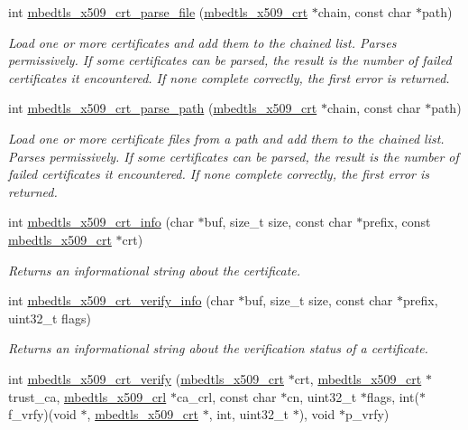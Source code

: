 \begin{DoxyCompactItemize}
int \mbox{\hyperlink{group__x509__module_gad4da63133d3590aa311488497d4c38ec}{mbedtls\+\_\+x509\+\_\+crt\+\_\+parse\+\_\+file}} (\mbox{\hyperlink{structmbedtls__x509__crt}{mbedtls\+\_\+x509\+\_\+crt}} $\ast$chain, const char $\ast$path)
\begin{DoxyCompactList}\small\item\em Load one or more certificates and add them to the chained list. Parses permissively. If some certificates can be parsed, the result is the number of failed certificates it encountered. If none complete correctly, the first error is returned. \end{DoxyCompactList}\item 
int \mbox{\hyperlink{group__x509__module_ga571fc89b9f3217ab3dd67bd7af905066}{mbedtls\+\_\+x509\+\_\+crt\+\_\+parse\+\_\+path}} (\mbox{\hyperlink{structmbedtls__x509__crt}{mbedtls\+\_\+x509\+\_\+crt}} $\ast$chain, const char $\ast$path)
\begin{DoxyCompactList}\small\item\em Load one or more certificate files from a path and add them to the chained list. Parses permissively. If some certificates can be parsed, the result is the number of failed certificates it encountered. If none complete correctly, the first error is returned. \end{DoxyCompactList}\item 
int \mbox{\hyperlink{group__x509__module_gabaf30f2269fc3b6608b25871f9d09da6}{mbedtls\+\_\+x509\+\_\+crt\+\_\+info}} (char $\ast$buf, size\+\_\+t size, const char $\ast$prefix, const \mbox{\hyperlink{structmbedtls__x509__crt}{mbedtls\+\_\+x509\+\_\+crt}} $\ast$crt)
\begin{DoxyCompactList}\small\item\em Returns an informational string about the certificate. \end{DoxyCompactList}\item 
int \mbox{\hyperlink{group__x509__module_gae88f1d8e6696eb2beeffe0a708219e6b}{mbedtls\+\_\+x509\+\_\+crt\+\_\+verify\+\_\+info}} (char $\ast$buf, size\+\_\+t size, const char $\ast$prefix, uint32\+\_\+t flags)
\begin{DoxyCompactList}\small\item\em Returns an informational string about the verification status of a certificate. \end{DoxyCompactList}\item 
int \mbox{\hyperlink{group__x509__module_ga98ed4504e4f832b735a230acf54fcde3}{mbedtls\+\_\+x509\+\_\+crt\+\_\+verify}} (\mbox{\hyperlink{structmbedtls__x509__crt}{mbedtls\+\_\+x509\+\_\+crt}} $\ast$crt, \mbox{\hyperlink{structmbedtls__x509__crt}{mbedtls\+\_\+x509\+\_\+crt}} $\ast$trust\+\_\+ca, \mbox{\hyperlink{structmbedtls__x509__crl}{mbedtls\+\_\+x509\+\_\+crl}} $\ast$ca\+\_\+crl, const char $\ast$cn, uint32\+\_\+t $\ast$flags, int($\ast$f\+\_\+vrfy)(void $\ast$, \mbox{\hyperlink{structmbedtls__x509__crt}{mbedtls\+\_\+x509\+\_\+crt}} $\ast$, int, uint32\+\_\+t $\ast$), void $\ast$p\+\_\+vrfy)

\end{DoxyCompactItemize}
